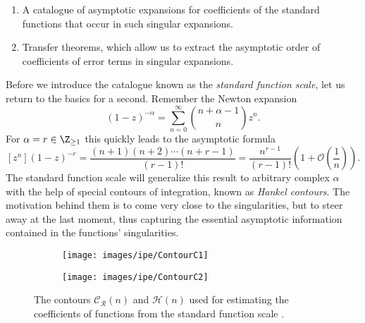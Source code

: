 \begin{enumerate}
  \item A catalogue of asymptotic expansions for coefficients of the standard functions that occur in such singular expansions.
  \item Transfer theorems, which allow us to extract the asymptotic order of coefficients of error terms in singular expansions.
\end{enumerate}

Before we introduce the catalogue known as the \textit{standard function scale}, let us return to the basics for a second.
Remember the Newton expansion
$$
  (1 - z)^{-\alpha} = \sum_{n = 0}^\infty \binom{n + \alpha - 1}{n} z^n.
$$
For $\alpha = r \in \Z_{\geq 1}$ this quickly leads to the asymptotic formula
$$
  [z^n](1 - z)^{-r} = \frac{(n+1)(n+2)\cdots(n + r -1)}{(r - 1)!}
  = \frac{n^{r-1}}{(r-1)!}\left(1 + \mathcal{O}\left(\frac{1}{n}\right)\right).
$$
The standard function scale will generalize this result to arbitrary complex $\alpha$ with the help of special contours of integration, known as \textit{Hankel contours}. The motivation behind them is to come very close to the singularities, but to steer away at the last moment, thus capturing the essential asymptotic information contained in the functions' singularities.

\begin{figure}[hbt!]
  \begin{subfigure}{.45 \textwidth}
    \centering
    \texttt{[image: images/ipe/ContourC1]}
  \end{subfigure}
  \hfill
  \begin{subfigure}{.45 \textwidth}
    \centering
    \texttt{[image: images/ipe/ContourC2]}
  \end{subfigure}
  \caption[The contours $\mathcal{C_R}(n)$ and $\mathcal{H}(n)$.]{The contours $\mathcal{C_R}(n)$ and $\mathcal{H}(n)$ used for estimating the coefficients of functions from the standard function scale \cite[Figure VI.2, p.~381]{AnalyticCombinatorics}.}
  \label{fig:contours}
\end{figure}

